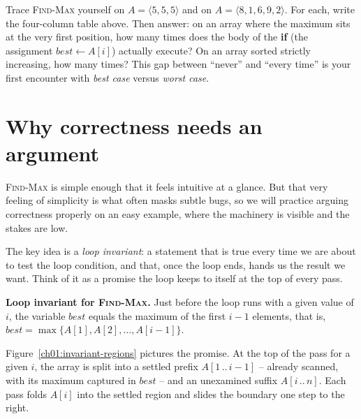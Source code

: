 \begin{labbox}
Trace \textsc{Find-Max} yourself on $A = \langle 5, 5, 5 \rangle$ and on
$A = \langle 8, 1, 6, 9, 2 \rangle$. For each, write the four-column table above.
Then answer: on an array where the maximum sits at the very first position, how many
times does the body of the \textbf{if} (the assignment $best \gets A[i]$) actually
execute? On an array sorted strictly increasing, how many times? This gap between
``never'' and ``every time'' is your first encounter with \emph{best case} versus
\emph{worst case}.
\end{labbox}

\section{Why correctness needs an argument}

\textsc{Find-Max} is simple enough that it feels intuitive at a glance. But that very
feeling of simplicity is what often masks subtle bugs, so we will practice arguing
correctness properly on an easy example, where the machinery is visible and the stakes are low.

The key idea is a \emph{loop invariant}: a statement that is true every time we are
about to test the loop condition, and that, once the loop ends, hands us the result
we want. Think of it as a promise the loop keeps to itself at the top of every pass.

\begin{focusbox}
\textbf{Loop invariant for \textsc{Find-Max}.} Just before the loop runs with a
given value of $i$, the variable $best$ equals the maximum of the first $i-1$
elements, that is, $best = \max\{A[1], A[2], \dots, A[i-1]\}$.
\end{focusbox}

Figure~\ref{ch01:invariant-regions} pictures the promise. At the top of the pass for
a given $i$, the array is split into a settled prefix $A[1\,..\,i-1]$ -- already
scanned, with its maximum captured in $best$ -- and an unexamined suffix
$A[i\,..\,n]$. Each pass folds $A[i]$ into the settled region and slides the
boundary one step to the right.


